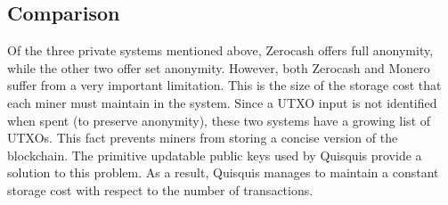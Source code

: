 \subsection{Comparison}

Of the three private systems mentioned above, Zerocash offers full anonymity, while the other two offer set anonymity. However, both Zerocash and Monero suffer from a very important limitation. This is the size of the storage cost that each miner must maintain in the system. Since a UTXO input is not identified when spent (to preserve anonymity), these two systems have a growing list of UTXOs. This fact prevents miners from storing a concise version of the blockchain. The primitive updatable public keys used by Quisquis provide a solution to this problem. As a result, Quisquis manages to maintain a constant storage cost with respect to the number of transactions.